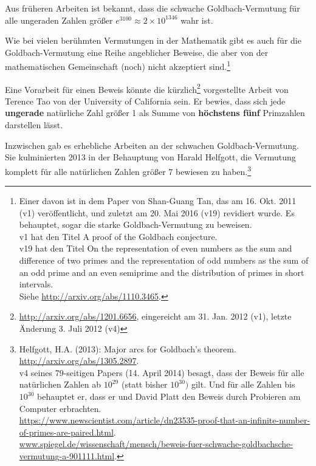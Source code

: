 \begin{refsegment}
Aus früheren Arbeiten ist bekannt, dass die schwache Goldbach-Vermutung
für alle ungeraden Zahlen größer $e^{3100}\approx 2 \times 10^{1346}$ wahr ist.

Wie bei vielen berühmten Vermutungen in der Mathematik gibt es auch für die
Goldbach-Vermutung eine Reihe angeblicher Beweise, die aber von der
mathematischen Gemeinschaft (noch) nicht akzeptiert sind.\footnote{%
Einer davon ist in dem Paper von Shan-Guang Tan, das am 16. Okt. 2011 (v1)
veröffentlicht, und zuletzt am 20. Mai 2016 (v19) revidiert wurde. Es
behauptet, sogar die starke Goldbach-Vermutung zu beweisen.\\
v1 hat den Titel \glqq A proof of the Goldbach conjecture\grqq.\\
v19 hat den Titel \glqq On the representation of even numbers as the sum and
difference of two primes and the representation of odd numbers as the sum of
an odd prime and an even semiprime and the distribution of primes in short
intervals\grqq.\\
Siehe \url{http://arxiv.org/abs/1110.3465}.
   }

Eine Vorarbeit für einen Beweis könnte die
kürzlich\footnote{\url{http://arxiv.org/abs/1201.6656}, eingereicht am
31. Jan. 2012 (v1), letzte Änderung 3. Juli 2012 (v4)} vorgestellte Arbeit
von Terence Tao von der University of California sein.
Er bewies, dass sich jede \textbf{ungerade} natürliche Zahl größer 1 als
Summe von \textbf{höchstens fünf} Primzahlen darstellen lässt.

Inzwischen gab es erhebliche Arbeiten an der schwachen Goldbach-Vermutung. Sie
kulminierten 2013 in der Behauptung von Harald Helfgott, die Vermutung komplett
für alle natürlichen Zahlen größer 7 bewiesen zu haben.\footnote{%
Helfgott, H.A. (2013): \glqq Major arcs for Goldbach's theorem\grqq.
\url{http://arxiv.org/abs/1305.2897}.\\
v4 seines 79-seitigen Papers (14. April 2014) besagt, dass der Beweis für alle
natürlichen Zahlen ab $10^{29}$ (statt bisher $10^{30})$ gilt. Und für alle
Zahlen bis $10^{30}$ behauptet er, dass er und David Platt den Beweis durch
Probieren am Computer erbrachten.
\\
\url{https://www.newscientist.com/article/dn23535-proof-that-an-infinite-number-of-primes-are-paired.html}.\\
\url{www.spiegel.de/wissenschaft/mensch/beweis-fuer-schwache-goldbachsche-vermutung-a-901111.html}.
}




\end{refsegment}

